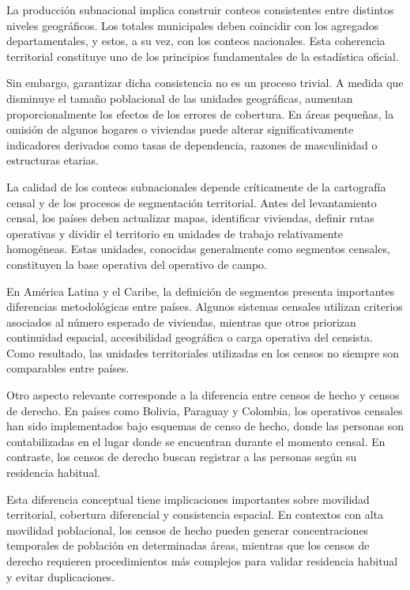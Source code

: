 \documentclass[
  spanish,
]{book}
\begin{document}
La producción subnacional implica construir conteos consistentes entre distintos niveles geográficos. Los totales municipales deben coincidir con los agregados departamentales, y estos, a su vez, con los conteos nacionales. Esta coherencia territorial constituye uno de los principios fundamentales de la estadística oficial.

Sin embargo, garantizar dicha consistencia no es un proceso trivial. A medida que disminuye el tamaño poblacional de las unidades geográficas, aumentan proporcionalmente los efectos de los errores de cobertura. En áreas pequeñas, la omisión de algunos hogares o viviendas puede alterar significativamente indicadores derivados como tasas de dependencia, razones de masculinidad o estructuras etarias.

La calidad de los conteos subnacionales depende críticamente de la cartografía censal y de los procesos de segmentación territorial. Antes del levantamiento censal, los países deben actualizar mapas, identificar viviendas, definir rutas operativas y dividir el territorio en unidades de trabajo relativamente homogéneas. Estas unidades, conocidas generalmente como segmentos censales, constituyen la base operativa del operativo de campo.

En América Latina y el Caribe, la definición de segmentos presenta importantes diferencias metodológicas entre países. Algunos sistemas censales utilizan criterios asociados al número esperado de viviendas, mientras que otros priorizan continuidad espacial, accesibilidad geográfica o carga operativa del censista. Como resultado, las unidades territoriales utilizadas en los censos no siempre son comparables entre países.

Otro aspecto relevante corresponde a la diferencia entre censos de hecho y censos de derecho. En países como Bolivia, Paraguay y Colombia, los operativos censales han sido implementados bajo esquemas de censo de hecho, donde las personas son contabilizadas en el lugar donde se encuentran durante el momento censal. En contraste, los censos de derecho buscan registrar a las personas según su residencia habitual.

Esta diferencia conceptual tiene implicaciones importantes sobre movilidad territorial, cobertura diferencial y consistencia espacial. En contextos con alta movilidad poblacional, los censos de hecho pueden generar concentraciones temporales de población en determinadas áreas, mientras que los censos de derecho requieren procedimientos más complejos para validar residencia habitual y evitar duplicaciones.
\end{document}
